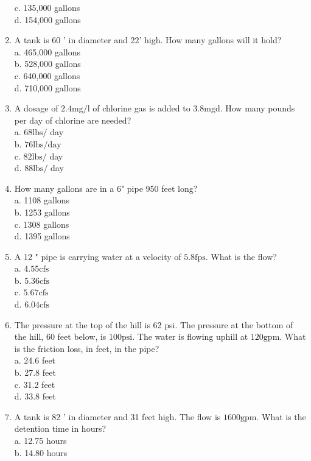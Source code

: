\begin{enumerate}
c. 135,000 gallons\\
d. 154,000 gallons\\
\item A tank is 60 ' in diameter and 22' high. How many gallons will it hold?\\
a. 465,000 gallons\\
b. 528,000 gallons\\
c. 640,000 gallons\\
d. 710,000 gallons\\
\item A dosage of $2.4 \mathrm{mg} / \mathrm{l}$ of chlorine gas is added to $3.8 \mathrm{mgd}$. How many pounds per day of chlorine are needed?\\
a. $68 \mathrm{lbs} /$ day\\
b. $76 \mathrm{lbs} / \mathrm{day}$\\
c. $82 \mathrm{lbs} /$ day\\
d. $88 \mathrm{lbs} /$ day\\
\item How many gallons are in a 6" pipe 950 feet long?\\
a. 1108 gallons\\
b. 1253 gallons\\
c. 1308 gallons\\
d. 1395 gallons\\
\item A 12 " pipe is carrying water at a velocity of $5.8 \mathrm{fps}$. What is the flow?\\
a. $4.55 \mathrm{cfs}$\\
b. $5.36 \mathrm{cfs}$\\
c. $5.67 \mathrm{cfs}$\\
d. $6.04 \mathrm{cfs}$\\
\item The pressure at the top of the hill is 62 psi. The pressure at the bottom of the hill, 60 feet below, is $100 \mathrm{psi}$. The water is flowing uphill at $120 \mathrm{gpm}$. What is the friction loss, in feet, in the pipe?\\
a. 24.6 feet\\
b. 27.8 feet\\
c. 31.2 feet\\
d. 33.8 feet
\item A tank is 82 ' in diameter and 31 feet high. The flow is $1600 \mathrm{gpm}$. What is the detention time in hours?\\
a. 12.75 hours\\
b. 14.80 hours\\

\end{enumerate}
